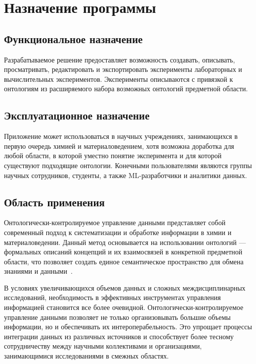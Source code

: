 \documentclass[a4paper,12pt,reqno]{article}
\begin{document}

\project{\unskip}


\firstPage
\newpage
\secondPage
\newpage
\thirdPage
\newpage

\section{Назначение программы}
\subsection{Функциональное назначение}
Разрабатываемое решение предоставляет возможность создавать, описывать, просматривать, редактировать и экспортировать эксперименты лабораторных и вычислительных экспериментов. Эксперименты описываются с привязкой к онтологиям из расширяемого набора возможных онтологий предметной области.

\subsection{Эксплуатационное назначение}
Приложение может использоваться в научных учреждениях, занимающихся в первую очередь химией и материаловедением, хотя возможна доработка для любой области, в которой уместно понятие эксперимента и для которой существуют подходящие онтологии. Конечными пользователями являются группы научных сотрудников, студенты, а также ML-разработчики и аналитики данных.

\subsection{Область применения}
Онтологически-контролируемое управление данными представляет собой современный подход к систематизации и обработке информации в химии и материаловедении. Данный метод основывается на использовании онтологий — формальных описаний концепций и их взаимосвязей в конкретной предметной области, что позволяет создать единое семантическое пространство для обмена знаниями и данными~\cite{ontology:base}.

В условиях увеличивающихся объемов данных и сложных междисциплинарных исследований, необходимость в эффективных инструментах управления информацией становится все более очевидной. Онтологически-контролируемое управление данными позволяет не только организовывать большие объемы информации, но и обеспечивать их интероперабельность. Это упрощает процессы интеграции данных из различных источников и способствует более тесному сотрудничеству между научными коллективами и организациями, занимающимися исследованиями в смежных областях.
\end{document}
